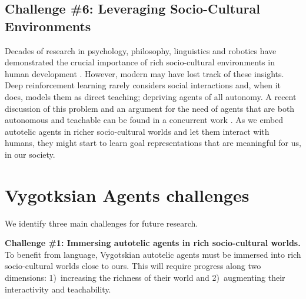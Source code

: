 \subsection{Challenge \#6: Leveraging Socio-Cultural Environments}
Decades of research in psychology, philosophy, linguistics and robotics have demonstrated the crucial importance of rich socio-cultural environments in human development \cite{vygotsky_thought_1934,whorf_language_1956,wood_role_1976,rumelhart_sequential_1986,berk_why_1994,clark_being_1998,tomasello_cultural_1999,tomasello_constructing_2009,zlatev_epigenesis_2001,carruthers_modularity_2002,dautenhahn_embodied_2002,lindblom_social_2003,mirolli_towards_2011,lupyan_what_2012}. However, modern \ai may have lost track of these insights. Deep reinforcement learning rarely considers social interactions and, when it does, models them as direct teaching; depriving agents of all autonomy. A recent discussion of this problem and an argument for the need of agents that are both autonomous and teachable can be found in a concurrent work \cite{sigaud2021towards}. As we embed autotelic agents in richer socio-cultural worlds and let them interact with humans, they might start to learn goal representations that are meaningful for us, in our society. 


\section{Vygotksian Agents challenges}

\label{sec:challenges}
We identify three main challenges for future research. 

\textbf{Challenge \#1: Immersing autotelic agents in rich socio-cultural worlds.}
To benefit from language, Vygotskian autotelic agents must be immersed into rich socio-cultural worlds close to ours. This will require progress along two dimensions: 1)~increasing the richness of their world and 2)~augmenting their interactivity and teachability.

